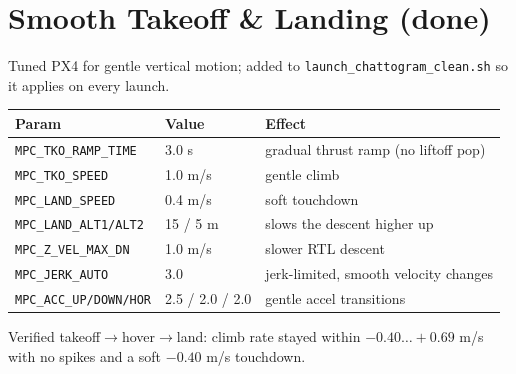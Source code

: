 \documentclass[11pt]{article}
\begin{document}
\section{Smooth Takeoff \& Landing (done)}
Tuned PX4 for gentle vertical motion; added to \texttt{launch\_chattogram\_clean.sh}
so it applies on every launch.
\begin{center}
\begin{tabular}{@{}lll@{}}
\toprule
Param & Value & Effect \\
\midrule
\texttt{MPC\_TKO\_RAMP\_TIME} & 3.0 s & gradual thrust ramp (no liftoff pop) \\
\texttt{MPC\_TKO\_SPEED} & 1.0 m/s & gentle climb \\
\texttt{MPC\_LAND\_SPEED} & 0.4 m/s & soft touchdown \\
\texttt{MPC\_LAND\_ALT1/ALT2} & 15 / 5 m & slows the descent higher up \\
\texttt{MPC\_Z\_VEL\_MAX\_DN} & 1.0 m/s & slower RTL descent \\
\texttt{MPC\_JERK\_AUTO} & 3.0 & jerk-limited, smooth velocity changes \\
\texttt{MPC\_ACC\_UP/DOWN/HOR} & 2.5 / 2.0 / 2.0 & gentle accel transitions \\
\bottomrule
\end{tabular}
\end{center}
Verified takeoff$\to$hover$\to$land: climb rate stayed within $-0.40 \ldots +0.69$ m/s
with no spikes and a soft $-0.40$ m/s touchdown.
\end{document}
